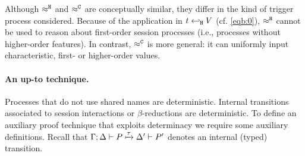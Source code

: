 \documentclass[runningheads]{llncs}
\begin{document}
{{\begin{remark}
Although $\approx^\mathtt{H}$ and $\approx^\mathtt{C}$ are conceptually similar, they differ in the kind of 
trigger process considered. Because of the application in 
$t \hookleftarrow_{\mathtt{H}} V$ (cf. \eqref{eqb:0}), $\approx^\mathtt{H}$ cannot be used to reason about first-order session processes (i.e., processes without higher-order features). In contrast, $\approx^\mathtt{C}$ is more general: it can uniformly input characteristic, first- or higher-order values. 
\end{remark}

%
%
%


\paragraph{An up-to technique.}
Processes that do not use shared names are deterministic. 
Internal transitions associated to session interactions or  
$\beta$-reductions are deterministic.  
To define an auxiliary proof technique that exploits determinacy we require some auxiliary definitions.
Recall that $\Gamma; \Delta \vdash P \xmapsto{\tau} \Delta' \vdash P'$ denotes an internal (typed) transition.
		
}}
\end{document}
